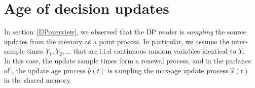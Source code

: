 \documentclass[conference, 10pt]{IEEEtran}
\newcommand{\maxage}{\hat{x}}
\newcommand{\dpage}{\hat{y}}
\newcommand{\RY}[1]{\quad {\color{red} #1} \quad}
\begin{document}
\section{Age of decision updates} \label{sec:decision-processing}
In section~\ref{DPoverview}, we observed that the DP reader is {\em sampling} the source updates from the memory as a point process. 
%
%
%
In particular, we assume the inter-sample times $Y_1,Y_2,\ldots$ that are
i.i.d continuous random variables identical to $Y$. In this case, the update sample times form a renewal process, and in the parlance of \cite{Yates-IT2020}, the update age process $\dpage(t)$ is sampling the max-age update process $\maxage(t)$ in the shared memory.  
\end{document}
